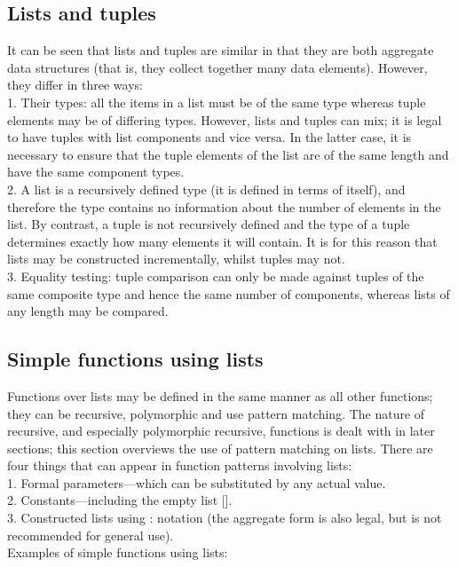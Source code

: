 \documentclass[11pt]{article}
\begin{document}
\subsection{Lists and tuples}

It can be seen that lists and tuples are similar in that they are both aggregate
data structures (that is, they collect together many data elements). However, they
differ in three ways:\\
1. Their types: all the items in a list must be of the same type whereas tuple
elements may be of differing types. However, lists and tuples can mix; it is
legal to have tuples with list components and vice versa. In the latter case,
it is necessary to ensure that the tuple elements of the list are of the same
length and have the same component types.\\
2. A list is a recursively defined type (it is defined in terms of itself), and therefore
the type contains no information about the number of elements in the
list. By contrast, a tuple is not recursively defined and the type of a tuple
determines exactly how many elements it will contain. It is for this reason
that lists may be constructed incrementally, whilst tuples may not.\\
3. Equality testing: tuple comparison can only be made against tuples of the
same composite type and hence the same number of components, whereas
lists of any length may be compared.

\subsection{Simple functions using lists}

Functions over lists may be defined in the same manner as all other functions; they
can be recursive, polymorphic and use pattern matching. The nature of recursive,
and especially polymorphic recursive, functions is dealt with in later sections; this
section overviews the use of pattern matching on lists. There are four things that
can appear in function patterns involving lists:\\
1. Formal parameters—which can be substituted by any actual value.\\
2. Constants—including the empty list [].\\
3. Constructed lists using : notation (the aggregate form is also legal, but is
not recommended for general use).\\

Examples of simple functions using lists:
\end{document}
